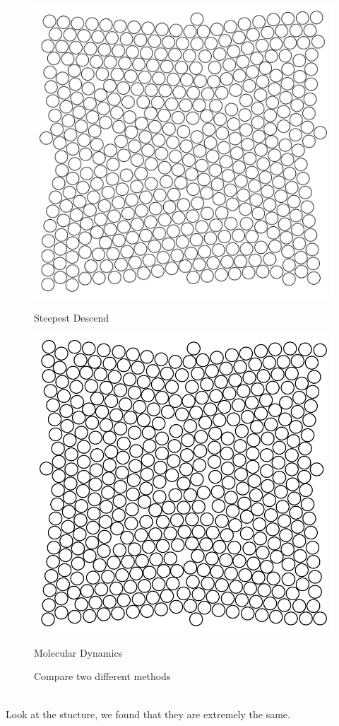 \documentclass[letterpaper]{article}
\begin{document}
	\begin{figure}[h]
		\centering
		\begin{minipage}[b]{0.25\textwidth}
			\includegraphics[width=\textwidth]{stepest.pdf}
			\caption{Steepest Descend}
		\end{minipage}
		\hspace{0.2\textwidth}
		\begin{minipage}[b]{0.25\textwidth}
			\includegraphics[width=\textwidth]{fire.pdf}
			\caption{Molecular Dynamics}
		\end{minipage}
		\caption{Compare two different methods}
	\end{figure}\\
	Look at the stucture, we found that they are extremely the same.
	\newpage
	\section{}
\end{document}
